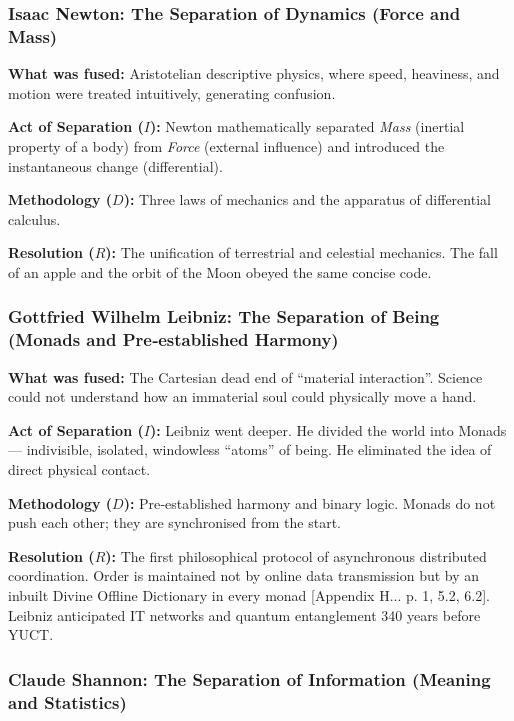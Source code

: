 \documentclass[12pt,a4paper]{article}
\begin{document}
	\subsubsection{Isaac Newton: The Separation of Dynamics (Force and Mass)}
	
	\textbf{What was fused:} Aristotelian descriptive physics, where speed, heaviness, and motion were treated intuitively, generating confusion.
	
	\textbf{Act of Separation (\(I\)):} Newton mathematically separated \emph{Mass} (inertial property of a body) from \emph{Force} (external influence) and introduced the instantaneous change (differential).
	
	\textbf{Methodology (\(D\)):} Three laws of mechanics and the apparatus of differential calculus.
	
	\textbf{Resolution (\(R\)):} The unification of terrestrial and celestial mechanics. The fall of an apple and the orbit of the Moon obeyed the same concise code.
	
	\subsubsection{Gottfried Wilhelm Leibniz: The Separation of Being (Monads and Pre‑established Harmony)}
	
	\textbf{What was fused:} The Cartesian dead end of “material interaction”. Science could not understand how an immaterial soul could physically move a hand.
	
	\textbf{Act of Separation (\(I\)):} Leibniz went deeper. He divided the world into Monads — indivisible, isolated, windowless “atoms” of being. He eliminated the idea of direct physical contact.
	
	\textbf{Methodology (\(D\)):} Pre‑established harmony and binary logic. Monads do not push each other; they are synchronised from the start.
	
	\textbf{Resolution (\(R\)):} The first philosophical protocol of asynchronous distributed coordination. Order is maintained not by online data transmission but by an inbuilt Divine Offline Dictionary in every monad [Appendix H... p. 1, 5.2, 6.2]. Leibniz anticipated IT networks and quantum entanglement 340 years before YUCT.
	
	\subsubsection{Claude Shannon: The Separation of Information (Meaning and Statistics)}
	
\end{document}
